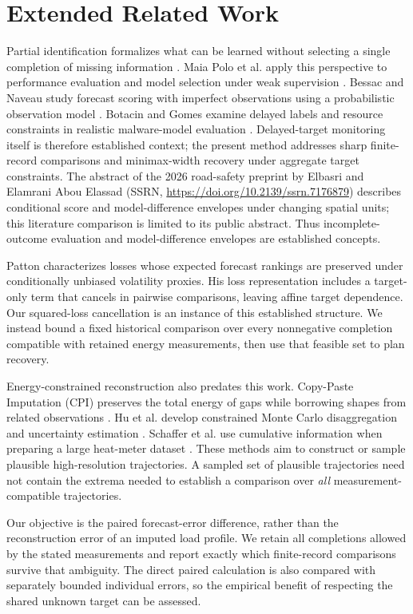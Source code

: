 \documentclass[12pt]{article}
\begin{document}
\FloatBarrier
\section{Extended Related Work}\label{app:extended-related-work}
Partial identification formalizes what can be learned without selecting a
single completion of missing information \cite{manski}. Maia Polo et al.
apply this perspective to performance evaluation and model selection under
weak supervision \cite{polo}. Bessac and Naveau study forecast scoring with
imperfect observations using a probabilistic observation model \cite{bessac}.
Botacin and Gomes examine delayed labels and resource constraints in
realistic malware-model evaluation \cite{botacin2025}. Delayed-target
monitoring itself is therefore established context; the present method
addresses sharp finite-record comparisons and minimax-width recovery under
aggregate target constraints.
The abstract of the 2026 road-safety preprint by Elbasri and Elamrani Abou
Elassad (SSRN, \url{https://doi.org/10.2139/ssrn.7176879}) describes
conditional score and model-difference envelopes under changing spatial
units; this literature comparison is limited to its public abstract.
Thus incomplete-outcome evaluation and model-difference
envelopes are established concepts.

Patton \cite{patton} characterizes losses whose expected forecast rankings
are preserved under conditionally unbiased volatility proxies. His loss
representation includes a target-only term that cancels in pairwise
comparisons, leaving affine target dependence. Our squared-loss cancellation
is an instance of this established structure. We instead bound a fixed
historical comparison over every nonnegative completion compatible with
retained energy measurements, then use that feasible set to plan recovery.

Energy-constrained reconstruction also predates this work. Copy-Paste
Imputation (CPI) preserves the total energy of gaps while borrowing shapes
from related observations \cite{cpi}. Hu et al. develop constrained Monte
Carlo disaggregation and uncertainty estimation \cite{hu}. Schaffer et al.
use cumulative information when preparing a large heat-meter dataset
\cite{heat}. These methods aim to construct or sample plausible high-resolution
trajectories. A sampled set of plausible trajectories need not contain the
extrema needed to establish a comparison over \emph{all} measurement-compatible
trajectories.

Our objective is the paired forecast-error difference, rather than the
reconstruction error of an imputed load profile. We retain all completions
allowed by the stated measurements and report exactly which finite-record
comparisons survive that ambiguity. The direct paired calculation is also
compared with separately bounded individual errors, so the empirical benefit
of respecting the shared unknown target can be assessed.
\end{document}

